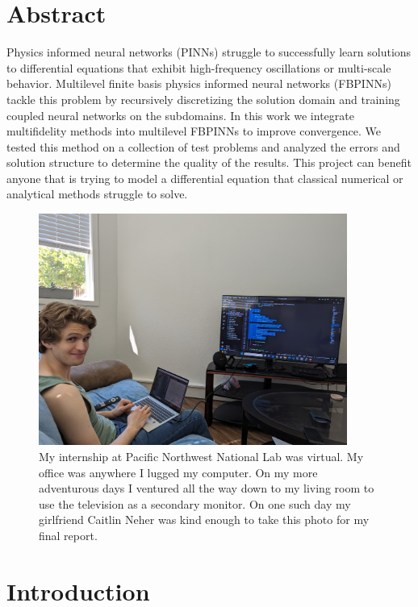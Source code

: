 \documentclass[12pt]{article}
\begin{document}
\section*{Abstract}
\begin{singlespace}
Physics informed neural networks (PINNs) struggle to successfully learn solutions to differential equations that exhibit high-frequency oscillations or multi-scale behavior. Multilevel finite basis physics informed neural networks (FBPINNs) tackle this problem by recursively discretizing the solution domain and training coupled neural networks on the subdomains. In this work we integrate multifidelity methods into multilevel FBPINNs to improve convergence. We tested this method on a collection of test problems and analyzed the errors and solution structure to determine the quality of the results. This project can benefit anyone that is trying to model a differential equation that classical numerical or analytical methods struggle to solve.
\end{singlespace}
\vspace{1cm}
\begin{figure}[H]
\center
\includegraphics[width = 0.9\textwidth]{imgs/me.jpg}
\caption{My internship at Pacific Northwest National Lab was virtual. My office was anywhere I lugged my computer. On my more adventurous days I ventured all the way down to my living room to use the television as a secondary monitor. On one such day my girlfriend Caitlin Neher was kind enough to take this photo for my final report.}
\label{fig:me}
\end{figure} 

\vfill
\newpage
\section{Introduction}
\end{document}
